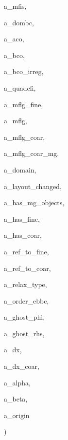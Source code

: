 {\begin{DoxyParamCaption}
\item[{const Ref\+Counted\+Ptr$<$ {\bf mfis} $>$ \&}]{a\+\_\+mfis, }
\item[{const Ref\+Counted\+Ptr$<$ Base\+Domain\+B\+C\+Factory $>$ \&}]{a\+\_\+dombc, }
\item[{const Ref\+Counted\+Ptr$<$ Level\+Data$<$ M\+F\+Cell\+F\+AB $>$ $>$ \&}]{a\+\_\+aco, }
\item[{const Ref\+Counted\+Ptr$<$ Level\+Data$<$ M\+F\+Flux\+F\+AB $>$ $>$ \&}]{a\+\_\+bco, }
\item[{const Ref\+Counted\+Ptr$<$ Level\+Data$<$ {\bf M\+F\+Base\+I\+V\+F\+AB} $>$ $>$ \&}]{a\+\_\+bco\+\_\+irreg, }
\item[{const {\bf N\+W\+O\+M\+F\+Quad\+C\+F\+Interp} \&}]{a\+\_\+quadcfi, }
\item[{const {\bf M\+F\+Level\+Grid} \&}]{a\+\_\+mflg\+\_\+fine, }
\item[{const {\bf M\+F\+Level\+Grid} \&}]{a\+\_\+mflg, }
\item[{const {\bf M\+F\+Level\+Grid} \&}]{a\+\_\+mflg\+\_\+coar, }
\item[{const {\bf M\+F\+Level\+Grid} \&}]{a\+\_\+mflg\+\_\+coar\+\_\+mg, }
\item[{const Problem\+Domain \&}]{a\+\_\+domain, }
\item[{const bool \&}]{a\+\_\+layout\+\_\+changed, }
\item[{const bool \&}]{a\+\_\+has\+\_\+mg\+\_\+objects, }
\item[{const bool \&}]{a\+\_\+has\+\_\+fine, }
\item[{const bool \&}]{a\+\_\+has\+\_\+coar, }
\item[{const int \&}]{a\+\_\+ref\+\_\+to\+\_\+fine, }
\item[{const int \&}]{a\+\_\+ref\+\_\+to\+\_\+coar, }
\item[{const int \&}]{a\+\_\+relax\+\_\+type, }
\item[{const int \&}]{a\+\_\+order\+\_\+ebbc, }
\item[{const Int\+Vect \&}]{a\+\_\+ghost\+\_\+phi, }
\item[{const Int\+Vect \&}]{a\+\_\+ghost\+\_\+rhs, }
\item[{const Real \&}]{a\+\_\+dx, }
\item[{const Real \&}]{a\+\_\+dx\+\_\+coar, }
\item[{const Real \&}]{a\+\_\+alpha, }
\item[{const Real \&}]{a\+\_\+beta, }
\item[{const Real\+Vect \&}]{a\+\_\+origin}
\end{DoxyParamCaption}
)\hspace{0.3cm}{\ttfamily [virtual]}}\hypertarget{classnwomfconductivityop_a3286b4c191b38e71527af64aaf40f612}{}\label{classnwomfconductivityop_a3286b4c191b38e71527af64aaf40f612}


